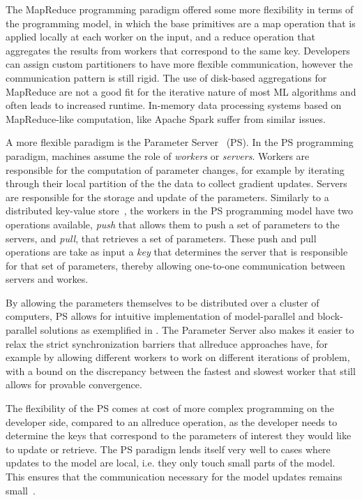 The MapReduce programming paradigm \cite{mapreduce} offered some more flexibility in terms of the
programming model, in which the base primitives are a map operation that is applied
locally at each worker on the input, and a reduce operation that aggregates the results
from workers that correspond to the same key. Developers can assign custom partitioners
to have more flexible communication, however the communication pattern is still rigid.
The use of disk-based aggregations for MapReduce are not a good fit for the iterative
nature of most ML algorithms and often leads to increased runtime\cite{distributed-ml-design}.
In-memory data processing systems based on MapReduce-like computation, like Apache Spark \cite{spark}
suffer from similar issues.

A more flexible paradigm is the Parameter Server~\cite{muPS} (PS). In the PS programming
paradigm, machines assume the role of \emph{workers} or \emph{servers}. Workers are
responsible for the computation of parameter changes, for example by iterating through
their local partition of the the data to collect gradient updates. Servers are responsible
for the storage and update of the parameters.
Similarly to a distributed key-value store~\cite{dynamo}, the workers in the PS programming
model have two operations available, \emph{push} that allows them to push a set of
parameters to the servers, and \emph{pull}, that retrieves a set of parameters.
These push and pull operations are take as input a \emph{key} that determines
the server that is responsible for that set of parameters, thereby allowing
one-to-one communication between servers and workes.

By allowing the parameters themselves to be
distributed over a cluster of computers, PS allows for intuitive implementation of
model-parallel and block-parallel solutions as exemplified in \cite{muPS, lightLDA}.
The Parameter Server also makes it easier to relax the strict synchronization
barriers that allreduce approaches have, for example by allowing different workers
to work on different iterations of problem, with a bound on the discrepancy between
the fastest and slowest worker that still allows for provable convergence\cite{stale-sync-ps}.

The flexibility of the PS comes at cost of more complex programming on the developer
side, compared to an allreduce operation, as the developer needs to determine the
keys that correspond to the parameters of interest they would like to update or
retrieve. The PS paradigm lends itself very well to cases where updates to the model
are local, i.e. they only touch small parts of the model. This ensures that the communication
necessary for the model updates remains small~\cite{muPS}.

